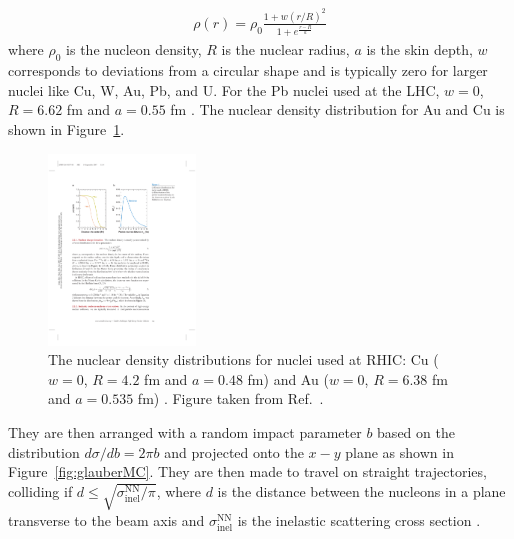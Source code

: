 \begin{align}
\rho(r) = \rho_0 \frac{1 + w (r/R)^2}{1+e^{\frac{r-R}{a}}}
\end{align}
where $\rho_0$ is the nucleon density, $R$ is the nuclear radius, $a$ is the skin depth, $w$ corresponds to deviations from a circular shape and is typically zero for larger nuclei like Cu, W, Au, Pb, and U.
For the Pb nuclei used at the LHC, $w = 0$, $R = 6.62$ fm and $a =0.55$ fm \cite{DEVRIES1987495}.
The nuclear density distribution for Au and Cu is shown in Figure~\ref{fig:nuclearDensity}.

\begin{figure}[htbp]
\begin{center}
\includegraphics[width=0.35\textwidth]{figures/theory/nuclearDensity}
\caption{ The nuclear density distributions for nuclei used at RHIC: Cu ($w = 0$, $R = 4.2$ fm and $a =0.48$ fm)  and Au ($w = 0$, $R = 6.38$ fm and $a =0.535$ fm) \cite{DEVRIES1987495}.
Figure taken from Ref.~\cite{doi:10.1146/annurev.nucl.57.090506.123020}.}
\label{fig:nuclearDensity}
\end{center}
\end{figure}

They are then arranged with a random impact parameter $b$ based on the distribution $d\sigma/d b = 2\pi b$ and projected onto the $x-y$ plane as shown in Figure~\ref{fig:glauberMC}.
They are then made to travel on straight trajectories, colliding if $d \leq \sqrt{\sigma_{\mathrm{inel}}^{\mathrm{NN}}/ \pi}$, where $d$ is the distance between the nucleons in a plane transverse to the beam axis and $\sigma_{\mathrm{inel}}^{\mathrm{NN}}$ is the inelastic scattering cross section \cite{doi:10.1146/annurev.nucl.57.090506.123020, Alver:2008aq}.

